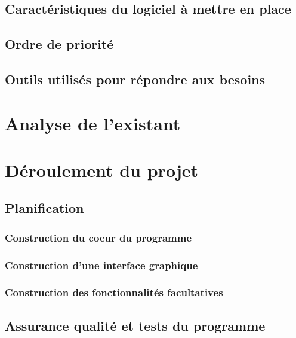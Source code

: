 \documentclass[a4paper]{article}
\begin{document}
	\subsection{Caractéristiques du logiciel à mettre en place}

		

	\subsection{Ordre de priorité}

		

	\subsection{Outils utilisés pour répondre aux besoins}

			
\section{Analyse de l'existant}



\section{Déroulement du projet}
	
	\subsection{Planification}

		
		\subsubsection{Construction du coeur du programme}

			

		\subsubsection{Construction d’une interface graphique}

			

		\subsubsection{Construction des fonctionnalités facultatives}

			

	\subsection{Assurance qualité et tests du programme}
\end{document}
